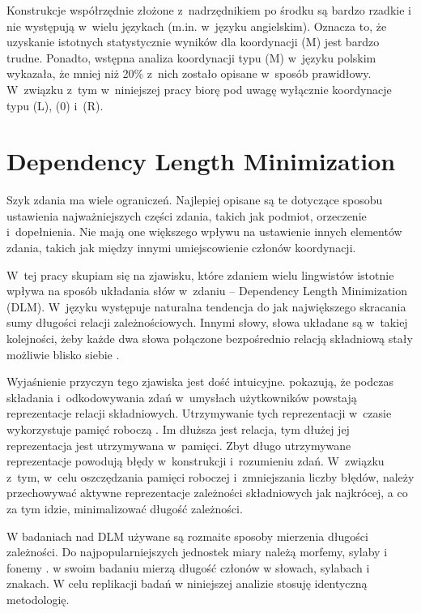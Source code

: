 Konstrukcje współrzędnie złożone z~nadrzędnikiem po środku są bardzo rzadkie i nie występują w~wielu językach (m.in. w~języku angielskim). Oznacza to, że uzyskanie istotnych statystycznie wyników dla koordynacji (M) jest bardzo trudne. Ponadto, wstępna analiza koordynacji typu (M) w~języku polskim wykazała, że mniej niż 20\% z~nich zostało opisane w~sposób prawidłowy. W~związku z~tym w~niniejszej pracy biorę pod uwagę wyłącznie koordynacje typu (L), (0) i~(R).

\section{Dependency Length Minimization}

Szyk zdania ma wiele ograniczeń. Najlepiej opisane są te dotyczące sposobu ustawienia najważniejszych części zdania, takich jak podmiot, orzeczenie i~dopełnienia. Nie mają one większego wpływu na ustawienie innych elementów zdania, takich jak między innymi umiejscowienie członów koordynacji.

W~tej pracy skupiam się na zjawisku, które zdaniem wielu lingwistów istotnie wpływa na sposób układania słów w~zdaniu -- Dependency Length Minimization (DLM). W~języku występuje naturalna tendencja do jak największego skracania sumy długości relacji zależnościowych. Innymi słowy, słowa układane są w~takiej kolejności, żeby każde dwa słowa połączone bezpośrednio relacją składniową stały możliwie blisko siebie \citep{temperley2007minimization}. %

Wyjaśnienie przyczyn tego zjawiska jest dość intuicyjne. \cite{king1991individual} pokazują, że podczas składania i~odkodowywania zdań w~umysłach użytkowników powstają reprezentacje relacji składniowych. Utrzymywanie tych reprezentacji w~czasie wykorzystuje pamięć roboczą \citep[s. 596]{king1991individual}. Im dłuższa jest relacja, tym dłużej jej reprezentacja jest utrzymywana w~pamięci. Zbyt długo utrzymywane reprezentacje powodują błędy w~konstrukcji i~rozumieniu zdań. W~związku z~tym, w~celu oszczędzania pamięci roboczej i~zmniejszania liczby błędów, należy przechowywać aktywne reprezentacje zależności składniowych jak najkrócej, a co za tym idzie, minimalizować długość zależności.

W badaniach nad DLM używane są rozmaite sposoby mierzenia długości zależności. Do najpopularniejszych jednostek miary należą morfemy, sylaby i fonemy \citep{lohmann2014english}. \cite{przepiorkowski2023conjunct} w swoim badaniu mierzą długość członów w słowach, sylabach i znakach. W celu replikacji badań w niniejszej analizie stosuję identyczną metodologię.

